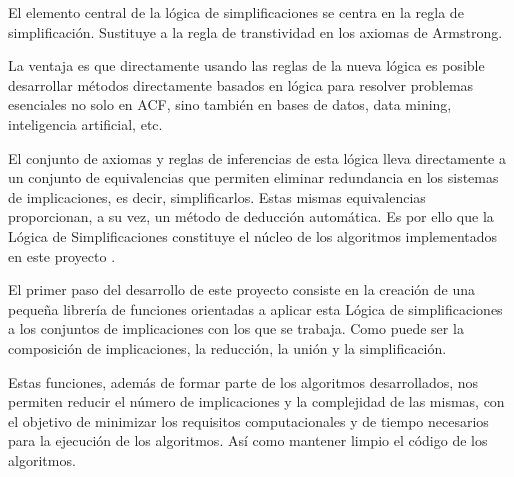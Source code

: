 El elemento central de la l\'ogica de simplificaciones se centra en la regla de simplificaci\'on. Sustituye a la regla de transtividad en los axiomas de Armstrong.

La ventaja es que directamente usando las reglas de la nueva l\'ogica es posible desarrollar m\'etodos directamente basados en l\'ogica para resolver problemas esenciales no solo en ACF, sino tambi\'en en bases de datos, data mining, inteligencia artificial, etc. 

El conjunto de axiomas y reglas de inferencias de esta l\'ogica lleva directamente a un conjunto de equivalencias que permiten eliminar redundancia en los sistemas de implicaciones, es decir, simplificarlos. Estas mismas equivalencias proporcionan, a su vez, un m\'etodo de deducci\'on autom\'atica. Es por ello que la L\'ogica de Simplificaciones constituye el n\'ucleo de los algoritmos implementados en este proyecto \cite{Cordero2002}\cite{dbasisslfd}\cite{Reduction}\cite{do}.

El primer paso del desarrollo de este proyecto consiste en la creaci\'on de una peque\~na librer\'ia de funciones
orientadas a aplicar esta L\'ogica de simplificaciones a los conjuntos de implicaciones con los que se trabaja. Como 
puede ser la composici\'on de implicaciones, la reducci\'on, la uni\'on y la simplificaci\'on.

Estas funciones, adem\'as de formar parte de los algoritmos desarrollados, nos permiten reducir el n\'umero de 
implicaciones y la complejidad de las mismas, con el objetivo de minimizar los requisitos computacionales y de tiempo
necesarios para la ejecuci\'on de los algoritmos. As\'i como mantener limpio el c\'odigo de los algoritmos.







